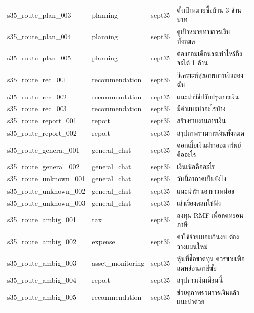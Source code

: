 \documentclass[11pt,a4paper]{article}
\begin{document}
{\begin{longtable}{lllp{9.5cm}}
s35\_\allowbreak{}route\_\allowbreak{}plan\_\allowbreak{}003 & planning & sept35 & {\thaifont ตั้งเป้าหมายซื้อบ้าน }3 {\thaifont ล้านบาท} \\
s35\_\allowbreak{}route\_\allowbreak{}plan\_\allowbreak{}004 & planning & sept35 & {\thaifont ดูเป้าหมายทางการเงินทั้งหมด} \\
s35\_\allowbreak{}route\_\allowbreak{}plan\_\allowbreak{}005 & planning & sept35 & {\thaifont ต้องออมเดือนละเท่าไหร่ถึงจะได้ }1 {\thaifont ล้าน} \\
s35\_\allowbreak{}route\_\allowbreak{}rec\_\allowbreak{}001 & recommendation & sept35 & {\thaifont วิเคราะห์สุขภาพการเงินของฉัน} \\
s35\_\allowbreak{}route\_\allowbreak{}rec\_\allowbreak{}002 & recommendation & sept35 & {\thaifont แนะนำวิธีปรับปรุงการเงิน} \\
s35\_\allowbreak{}route\_\allowbreak{}rec\_\allowbreak{}003 & recommendation & sept35 & {\thaifont มีคำแนะนำอะไรบ้าง} \\
s35\_\allowbreak{}route\_\allowbreak{}report\_\allowbreak{}001 & report & sept35 & {\thaifont สร้างรายงานการเงิน} \\
s35\_\allowbreak{}route\_\allowbreak{}report\_\allowbreak{}002 & report & sept35 & {\thaifont สรุปภาพรวมการเงินทั้งหมด} \\
s35\_\allowbreak{}route\_\allowbreak{}general\_\allowbreak{}001 & general\_\allowbreak{}chat & sept35 & {\thaifont ดอกเบี้ยเงินฝากออมทรัพย์คืออะไร} \\
s35\_\allowbreak{}route\_\allowbreak{}general\_\allowbreak{}002 & general\_\allowbreak{}chat & sept35 & {\thaifont เงินเฟ้อคืออะไร} \\
s35\_\allowbreak{}route\_\allowbreak{}unknown\_\allowbreak{}001 & general\_\allowbreak{}chat & sept35 & {\thaifont วันนี้อากาศเป็นยังไง} \\
s35\_\allowbreak{}route\_\allowbreak{}unknown\_\allowbreak{}002 & general\_\allowbreak{}chat & sept35 & {\thaifont แนะนำร้านอาหารหน่อย} \\
s35\_\allowbreak{}route\_\allowbreak{}unknown\_\allowbreak{}003 & general\_\allowbreak{}chat & sept35 & {\thaifont เล่าเรื่องตลกให้ฟัง} \\
s35\_\allowbreak{}route\_\allowbreak{}ambig\_\allowbreak{}001 & tax & sept35 & {\thaifont ลงทุน }RMF {\thaifont เพื่อลดหย่อนภาษี} \\
s35\_\allowbreak{}route\_\allowbreak{}ambig\_\allowbreak{}002 & expense & sept35 & {\thaifont ค่าใช้จ่ายเยอะเกินงบ ต้องวางแผนใหม่} \\
s35\_\allowbreak{}route\_\allowbreak{}ambig\_\allowbreak{}003 & asset\_\allowbreak{}monitoring & sept35 & {\thaifont หุ้นที่ซื้อขาดทุน ควรขายเพื่อลดหย่อนภาษีมั้ย} \\
s35\_\allowbreak{}route\_\allowbreak{}ambig\_\allowbreak{}004 & report & sept35 & {\thaifont สรุปการเงินเดือนนี้} \\
s35\_\allowbreak{}route\_\allowbreak{}ambig\_\allowbreak{}005 & recommendation & sept35 & {\thaifont ช่วยดูภาพรวมการเงินแล้วแนะนำด้วย} \\
\end{longtable}}
\end{document}
